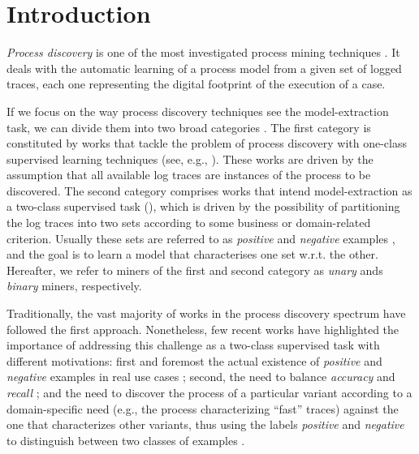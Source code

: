 

\section{Introduction}
\label{sec:introduction}

\emph{Process discovery} is one of the most investigated process mining techniques \cite{2012-Aalst}. It deals with the automatic learning of a process model from a given set of logged traces, each one representing the digital footprint of the execution of a case.

If we focus on the way process discovery techniques see the model-extraction task, we can divide them into two broad categories \cite{2018-Ponce,DBLP:conf/bpm/SlaatsDB21}. The first category is constituted by works that tackle the problem of process discovery with one-class supervised learning techniques (see, e.g., \cite{2010-Aalst,2004-Aalst,2007-Gunther,2003-Weijters}). These works are driven by the assumption that all available log traces are instances of the process to be discovered. The second category comprises works that intend model-extraction as a two-class supervised task (\cite{2009-Chesani,2009-Goedertier,2006-Maruster}), which is driven by the possibility of partitioning the log traces into two sets according to some business or domain-related criterion. Usually these sets are referred to as \emph{positive} and \emph{negative} examples \cite{2018-Ponce,DBLP:conf/bpm/SlaatsDB21}, and the goal is to learn a model that characterises one set w.r.t. the other. Hereafter, we refer to miners of the first and second category as \emph{unary} ands \emph{binary} miners, respectively. 

Traditionally, the vast majority of works in the process discovery spectrum have followed the first approach. Nonetheless, few recent works \cite{deviant-tkde,2018-Ponce,DBLP:conf/bpm/SlaatsDB21} have highlighted the importance of addressing this challenge as a two-class supervised task with different motivations: first and foremost the actual existence of \emph{positive} and \emph{negative} examples in real use cases \cite{2018-Ponce,DBLP:conf/bpm/SlaatsDB21}; second, the need to balance \emph{accuracy} and \emph{recall} \cite{DBLP:conf/bpm/SlaatsDB21}; and the need to discover the process of a particular variant according to a domain-specific need (e.g., the process characterizing ``fast'' traces) against the one that characterizes other variants, thus using the labels \emph{positive} and \emph{negative} to distinguish between two classes of examples \cite{deviant-tkde}.  

